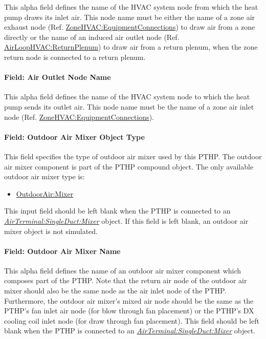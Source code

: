 This alpha field defines the name of the HVAC system node from which the heat pump draws its inlet air. This node name must be either the name of a zone air exhaust node (Ref. \hyperref[zonehvacequipmentconnections]{ZoneHVAC:EquipmentConnections}) to draw air from a zone directly or the name of an induced air outlet node (Ref. \hyperref[airloophvacreturnplenum]{AirLoopHVAC:ReturnPlenum}) to draw air from a return plenum, when the zone return node is connected to a return plenum.

\paragraph{Field: Air Outlet Node Name}\label{field-air-outlet-node-name-6-001}

This alpha field defines the name of the HVAC system node to which the heat pump sends its outlet air. This node name must be the name of a zone air inlet node (Ref. \hyperref[zonehvacequipmentconnections]{ZoneHVAC:EquipmentConnections}).

\paragraph{Field: Outdoor Air Mixer Object Type}\label{field-outdoor-air-mixer-object-type-3}

This field specifies the type of outdoor air mixer used by this PTHP. The outdoor air mixer component is part of the PTHP compound object. The only available outdoor air mixer type is:

\begin{itemize}
\tightlist
\item
  \hyperref[outdoorairmixer]{OutdoorAir:Mixer}
\end{itemize}

This input field should be left blank when the PTHP is connected to an \textit{\hyperref[airterminalsingleductmixer]{AirTerminal:SingleDuct:Mixer}} object. If this field is left blank, an outdoor air mixer object is not simulated.

\paragraph{Field: Outdoor Air Mixer Name}\label{field-outdoor-air-mixer-name-3}

This alpha field defines the name of an outdoor air mixer component which composes part of the PTHP. Note that the return air node of the outdoor air mixer should also be the same node as the air inlet node of the PTHP. Furthermore, the outdoor air mixer's mixed air node should be the same as the PTHP's fan inlet air node (for blow through fan placement) or the PTHP's DX cooling coil inlet node (for draw through fan placement). This field should be left blank when the PTHP is connected to an \textit{\hyperref[airterminalsingleductmixer]{AirTerminal:SingleDuct:Mixer}} object.


